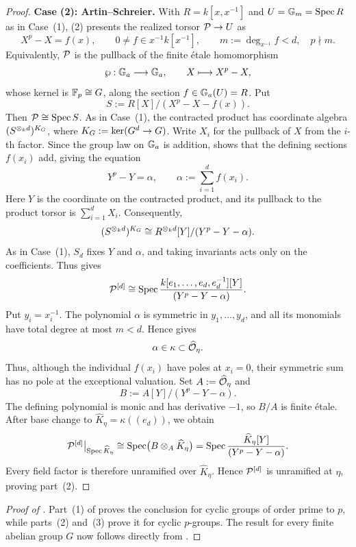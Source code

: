\begin{proof}
\medskip
\noindent\textbf{Case (2): Artin--Schreier.}
With $R=k[x,x^{-1}]$ and $U=\mathbb{G}_m=\operatorname{Spec} R$ as in Case~(1),
(2) presents the realized torsor
$\mathcal{P}\to U$ as
\[
    X^p-X=f(x),\qquad
    0\ne f\in x^{-1}k[x^{-1}],\qquad
    m:=\deg_{x^{-1}}f<d,\quad p\nmid m.
\]
Equivalently, $\mathcal{P}$ is the pullback of the finite \'etale homomorphism
\[
    \wp:\mathbb{G}_a\longrightarrow\mathbb{G}_a,\qquad X\longmapsto X^p-X,
\]
whose kernel is $\mathbb{F}_p\cong G$, along the section
$f\in\mathbb{G}_a(U)=R$. Put
\[
    S:=R[X]/(X^p-X-f(x)).
\]
Then $\mathcal{P}\cong\operatorname{Spec} S$. As in Case~(1), the contracted product has coordinate
algebra $(S^{\otimes_k d})^{K_{G}}$, where
$K_{G}:=\ker(G^d\to G)$. Write $X_i$ for the pullback of $X$ from the $i$-th
factor. Since the group law on $\mathbb{G}_a$ is addition,
 shows that the defining sections
$f(x_i)$ add, giving the equation
\[
    Y^p-Y=\alpha,
    \qquad
    \alpha:=\sum_{i=1}^d f(x_i).
\]
Here $Y$ is the coordinate on the contracted product, and its pullback to
the product torsor is $\sum_{i=1}^d X_i$. Consequently,
\[
    (S^{\otimes_k d})^{K_{G}}
       \cong
    R^{\otimes_k d}[Y]/(Y^p-Y-\alpha).
\]
As in Case~(1), $S_d$ fixes $Y$ and $\alpha$, and taking invariants acts
only on the coefficients. Thus
 gives
\[
    \mathcal{P}^{[d]}\cong
    \operatorname{Spec}\frac{k[e_1,\dots,e_d,e_d^{-1}][Y]}{(Y^p-Y-\alpha)}.
\]
Put $y_i=x_i^{-1}$. The polynomial $\alpha$ is symmetric in
$y_1,\dots,y_d$, and all its monomials have total degree at most $m<d$.
Hence
 gives
\[
    \alpha\in\kappa\subset\widehat{\mathcal{O}}_\eta.
\]
Thus, although the individual $f(x_i)$ have poles at $x_i=0$, their
symmetric sum has no pole at the exceptional valuation.
Set $A:=\widehat{\mathcal{O}}_\eta$ and
\[
    B:=A[Y]/(Y^p-Y-\alpha).
\]
The defining polynomial is monic and has derivative $-1$, so $B/A$ is
finite \'etale. After base change to
$\widehat K_\eta=\kappa((e_d))$, we obtain
\[
    \mathcal{P}^{[d]}\big|_{\operatorname{Spec}\widehat K_\eta}
       \cong
    \operatorname{Spec}\bigl(B\otimes_A\widehat K_\eta\bigr)
       =\operatorname{Spec}\frac{\widehat K_\eta[Y]}{(Y^p-Y-\alpha)}.
\]
Every field factor is therefore unramified over $\widehat K_\eta$. Hence
$\mathcal{P}^{[d]}$ is unramified at $\eta$, proving part~(2).


\end{proof}

\begin{proof}[Proof of ]
Part~(1) of  proves the conclusion
for cyclic groups of order prime to $p$, while parts~(2) and~(3) prove it
for cyclic $p$-groups. The result for every finite abelian group $G$ now
follows directly from .
\end{proof}

